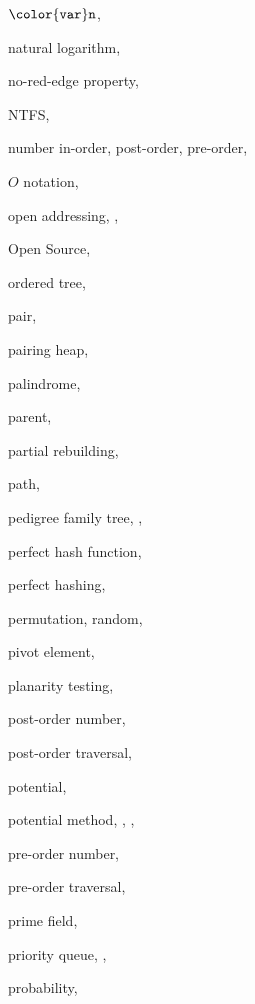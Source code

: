 \documentclass[10pt]{book}
\theoremstyle{plain}
\theoremstyle{definition}
\begin{document}
\begin{theindex}
  \indexspace

  \item \ensuremath  {\mathtt  {{\color  {var}n}}}, 
  \item natural logarithm, 
  \item no-red-edge property, 
  \item NTFS, 
  \item number
    \subitem in-order, 
    \subitem post-order, 
    \subitem pre-order, 

  \indexspace

  \item $O$ notation, 
  \item open addressing, , 
  \item Open Source, 
  \item ordered tree, 

  \indexspace

  \item pair, 
  \item pairing heap, 
  \item palindrome, 
  \item parent, 
  \item partial rebuilding, 
  \item path, 
  \item pedigree family tree, , 
  \item perfect hash function, 
  \item perfect hashing, 
  \item permutation, 
    \subitem random, 
  \item pivot element, 
  \item planarity testing, 
  \item post-order number, 
  \item post-order traversal, 
  \item potential, 
  \item potential method, , , 
  \item pre-order number, 
  \item pre-order traversal, 
  \item prime field, 
  \item priority queue, , 
  \item probability, 


\end{theindex}
\end{document}
